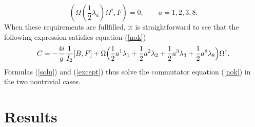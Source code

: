 \documentclass[a4paper,12pt]{article}
\begin{document}
\begin{equation} \label{excon}
\left( \Omega \left( \frac{1}{2} \lambda_a \right)  \Omega^{\dagger},F \right) = 0, \qquad a = 1,2,3,8. 
\end{equation}
When these requirements are fullfilled, it is straightforward to see that the following expression satisfies equation (\ref{nok})
\begin{equation}\label{except}
C = - \frac{4i}{g} \frac{1}{I_2} [B,F]  + \Omega \Bigl( \frac{1}{2} a^1 \lambda_1 + \frac{1}{2} a^2 \lambda_2  + \frac{1}{2} a^3 \lambda_3 + \frac{1}{2} a^8 \lambda_8 \Bigr) \Omega^{\dagger}.
\end{equation}
Formulas (\ref{solu}) and (\ref{except}) thus solve the commutator equation (\ref{nok}) in the two nontrivial cases.

\section{Results}
\end{document}
